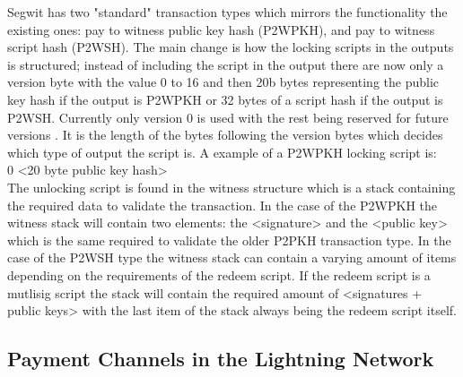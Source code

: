Segwit has two "standard" transaction types which mirrors the functionality the existing ones: pay to witness public key hash (P2WPKH), and pay to witness script hash (P2WSH). The main change is how the locking scripts in the outputs is structured; instead of including the script in the output there are now only a version byte with the value 0 to 16 and then 20b bytes representing the public key hash if the output is P2WPKH or 32 bytes of a script hash if the output is P2WSH. Currently only version 0 is used with the rest being reserved for future versions \cite{BIP141}. It is the length of the bytes following the version bytes which decides which type of output the script is. A example of a P2WPKH locking script is:
\\

0 <20 byte public key hash>
\\

The unlocking script is found in the witness structure which is a stack containing the required data to validate the transaction.
In the case of the P2WPKH the witness stack will contain two elements: the <signature> and the <public key> which is the same required to validate the older P2PKH transaction type. In the case of the P2WSH type the witness stack can contain a varying amount of items depending on the requirements of the redeem script. If the redeem script is a mutlisig script the stack will contain the required amount of <signatures + public keys> with the last item of the stack always being the redeem script itself.

\subsection{Payment Channels in the Lightning Network} 

